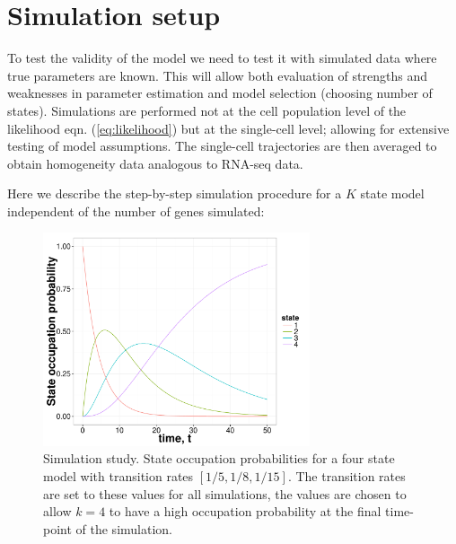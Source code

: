 \section{Simulation setup}
\label{sec:sim-study}

To test the validity of the model we need to test it with simulated data where true parameters are known. This will allow both evaluation of strengths and weaknesses in parameter estimation and model selection (choosing number of states). Simulations are performed not at the cell population level of the likelihood eqn. (\ref{eq:likelihood}) but at the single-cell level; allowing for extensive testing of model assumptions. The single-cell trajectories are then averaged to obtain homogeneity data analogous to RNA-seq data.

Here we describe the step-by-step simulation procedure for a $K$ state model independent of the number of genes simulated:

\begin{figure}
  \centering
  \includegraphics[width=0.7\textwidth]{pics/trans-rates.pdf}
  \caption{Simulation study. State occupation probabilities for a four state model with transition rates $[1/5, 1/8, 1/15]$. The transition rates are set to these values for all simulations, the values are chosen to allow $k=4$ to have a high occupation probability at the final time-point of the simulation.}
  \label{fig:transition-rates}
\end{figure}

